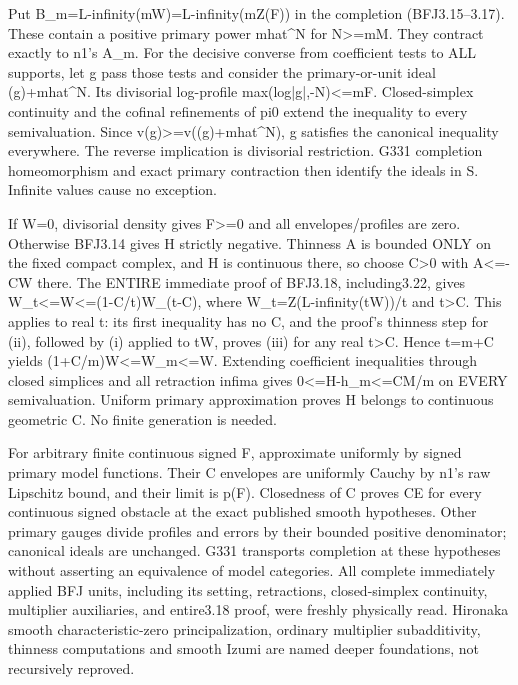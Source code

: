 \documentclass[11pt]{article}
\begin{document}
Put B\_m=L-infinity(mW)=L-infinity(mZ(F)) in the completion (BFJ3.15--3.17). These contain a positive primary power mhat\textasciicircum{}N for N\textgreater{}=mM. They contract exactly to n1's A\_m. For the decisive converse from coefficient tests to ALL supports, let g pass those tests and consider the primary-or-unit ideal (g)+mhat\textasciicircum{}N. Its divisorial log-profile max(log|g|,-N)\textless{}=mF. Closed-simplex continuity and the cofinal refinements of pi0 extend the inequality to every semivaluation. Since v(g)\textgreater{}=v((g)+mhat\textasciicircum{}N), g satisfies the canonical inequality everywhere. The reverse implication is divisorial restriction. G331 completion homeomorphism and exact primary contraction then identify the ideals in S. Infinite values cause no exception.

If W=0, divisorial density gives F\textgreater{}=0 and all envelopes/profiles are zero. Otherwise BFJ3.14 gives H strictly negative. Thinness A is bounded ONLY on the fixed compact complex, and H is continuous there, so choose C\textgreater{}0 with A\textless{}=-CW there. The ENTIRE immediate proof of BFJ3.18, including3.22, gives W\_t\textless{}=W\textless{}=(1-C/t)W\_(t-C), where W\_t=Z(L-infinity(tW))/t and t\textgreater{}C. This applies to real t: its first inequality has no C, and the proof's thinness step for (ii), followed by (i) applied to tW, proves (iii) for any real t\textgreater{}C. Hence t=m+C yields (1+C/m)W\textless{}=W\_m\textless{}=W. Extending coefficient inequalities through closed simplices and all retraction infima gives 0\textless{}=H-h\_m\textless{}=CM/m on EVERY semivaluation. Uniform primary approximation proves H belongs to continuous geometric C. No finite generation is needed.

For arbitrary finite continuous signed F, approximate uniformly by signed primary model functions. Their C envelopes are uniformly Cauchy by n1's raw Lipschitz bound, and their limit is p(F). Closedness of C proves CE for every continuous signed obstacle at the exact published smooth hypotheses. Other primary gauges divide profiles and errors by their bounded positive denominator; canonical ideals are unchanged. G331 transports completion at these hypotheses without asserting an equivalence of model categories. All complete immediately applied BFJ units, including its setting, retractions, closed-simplex continuity, multiplier auxiliaries, and entire3.18 proof, were freshly physically read. Hironaka smooth characteristic-zero principalization, ordinary multiplier subadditivity, thinness computations and smooth Izumi are named deeper foundations, not recursively reproved.
\end{document}
